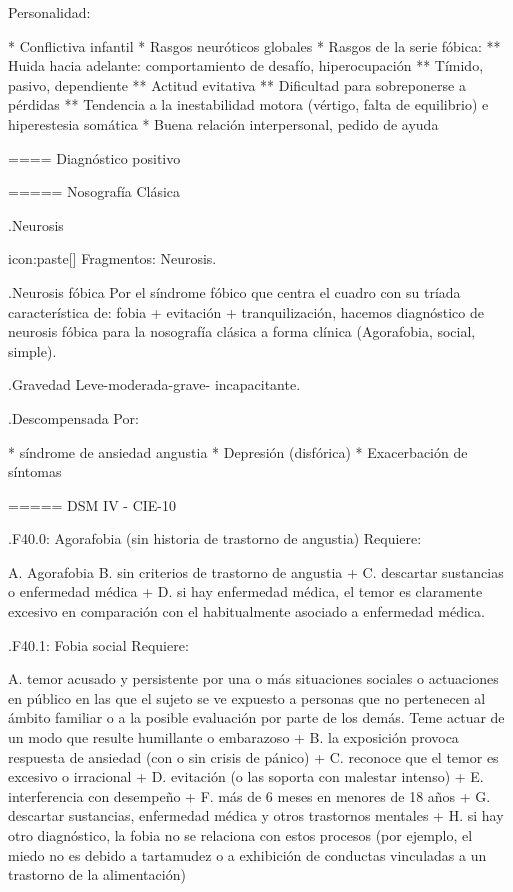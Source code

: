 Personalidad:
\begin{itemize}
* Conflictiva infantil
* Rasgos neuróticos globales
* Rasgos de la serie fóbica:
** Huida hacia adelante: comportamiento de desafío, hiperocupación
** Tímido, pasivo, dependiente
** Actitud evitativa
** Dificultad para sobreponerse a pérdidas
** Tendencia a la inestabilidad motora (vértigo, falta de equilibrio) e hiperestesia somática
* Buena relación interpersonal, pedido de ayuda

==== Diagnóstico positivo

===== Nosografía Clásica

.Neurosis

icon:paste[] Fragmentos: Neurosis.

.Neurosis fóbica
Por el síndrome fóbico que centra el cuadro con su tríada característica de: fobia + evitación + tranquilización, hacemos diagnóstico de neurosis fóbica para la nosografía clásica a forma clínica (Agorafobia, social, simple).

.Gravedad
Leve-moderada-grave- incapacitante.

.Descompensada
Por:

* síndrome de ansiedad angustia
* Depresión (disfórica)
* Exacerbación de síntomas

===== DSM IV - CIE-10

.F40.0: Agorafobia (sin historia de trastorno de angustia)
Requiere:

A. Agorafobia
B. sin criterios de trastorno de angustia +
C. descartar sustancias o enfermedad médica +
D. si hay enfermedad médica, el temor es claramente excesivo en comparación con el habitualmente asociado a enfermedad médica.

.F40.1: Fobia social
Requiere:

A. temor acusado y persistente por una o más situaciones sociales o actuaciones en público en las que el sujeto se ve expuesto a personas que no pertenecen al ámbito familiar o a la posible evaluación por parte de los demás. Teme actuar de un modo que resulte humillante o embarazoso +
B. la exposición provoca respuesta de ansiedad (con o sin crisis de pánico) +
C. reconoce que el temor es excesivo o irracional +
D. evitación (o las soporta con malestar intenso) +
E. interferencia con desempeño +
F. más de 6 meses en menores de 18 años +
G. descartar sustancias, enfermedad médica y otros trastornos mentales +
H. si hay otro diagnóstico, la fobia no se relaciona con estos procesos (por ejemplo, el miedo no es debido a tartamudez o a exhibición de conductas vinculadas a un trastorno de la alimentación)


\end{itemize}
